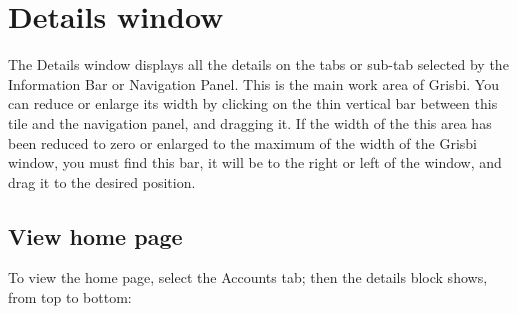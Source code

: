 \ifIllustration
\else
\newpage
\fi


\section{Details window\label{home-details}}

The Details window displays all the details on the tabs or sub-tab selected by the Information Bar or Navigation Panel. This is the main work area of Grisbi.
You can reduce or enlarge its width by clicking on the thin vertical bar between this tile and the navigation panel, and dragging it. If the width of the this area has been reduced to zero or enlarged to the maximum of the width of the Grisbi window, you must find this bar, it will be to the right or left of the window, and drag it to the desired position.
 
\subsection{View home page\label{home-details-homepage}}

To view the home page, select the Accounts tab; then the details block shows, from top to bottom:

